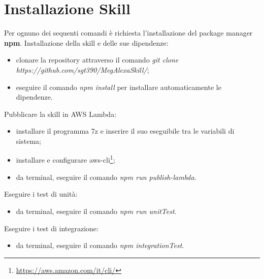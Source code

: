 \newpage
\section{Installazione Skill}
\label{installazioneSkill}
Per ognuno dei sequenti comandi è richiesta l'installazione del package manager \textbf{npm}.
Installazione della skill e delle sue dipendenze:
\begin{itemize}
    \item clonare la repository attraverso il comando \textit{git clone\\https://github.com/sgt390/MegAlexaSkill/};
    \item eseguire il comando \textit{npm install} per installare automaticamente le dipendenze.
\end{itemize}
Pubblicare la skill in AWS Lambda:
\begin{itemize}
    \item installare il programma 7z e inserire il suo eseguibile tra le variabili di sistema;
    \item installare e configurare aws-cli\footnote{\url{https://aws.amazon.com/it/cli/}};
    \item da terminal, eseguire il comando \textit{npm run publish-lambda}.
\end{itemize}
Eseguire i test di unità:
\begin{itemize}
    \item da terminal, eseguire il comando \textit{npm run unitTest}.
\end{itemize}
Eseguire i test di integrazione:
\begin{itemize}
    \item da terminal, eseguire il comando \textit{npm integrationTest}.
\end{itemize}
